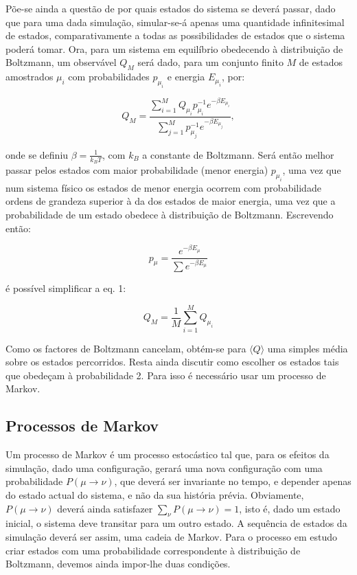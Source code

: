 \documentclass[a4paper,10pt]{article}
\begin{document}
\begin{multicols}{2}
Põe-se ainda a questão de por quais estados do sistema se deverá passar, dado que para uma dada simulação, simular-se-á apenas uma quantidade infinitesimal de estados, comparativamente a todas as possibilidades de estados que o sistema poderá tomar. Ora, para um sistema em equilíbrio obedecendo à distribuição de Boltzmann, um observável $Q_M$ será dado, para um conjunto finito $M$ de estados amostrados $\mu_i$ com probabilidades $p_{\mu_i}$ e energia $E_{\mu_i}$, por:

\begin{equation}
Q_M = \frac{\sum^M_{i=1}Q_{\mu_i}p_{\mu_i}^{-1}e^{-\beta E_{\mu_i}}}{\sum^M_{j=1}p_{\mu_j}^{-1}e^{-\beta E_{\mu_j}}} ,
\end{equation}

onde se definiu $\beta = \frac{1}{k_B T}$, com $k_B$ a constante de Boltzmann. Será então melhor passar pelos estados com maior probabilidade (menor energia) $p_{\mu_i}$, uma vez que num sistema físico os estados de menor energia ocorrem com probabilidade ordens de grandeza superior à da dos estados de maior energia, uma vez que a probabilidade de um estado obedece à distribuição de Boltzmann. Escrevendo então:

\begin{equation}
p_{\mu}=\frac{e^{-\beta E_{\mu}}}{\sum e^{-\beta E_{\mu}}}
\end{equation}

é possível simplificar a eq. 1:

\begin{equation}
Q_M = \frac{1}{M}\sum^M_{i=1}Q_{\mu_i}
\end{equation}

Como os factores de Boltzmann cancelam, obtém-se para $\langle Q \rangle$ uma simples média sobre os estados percorridos. Resta ainda discutir como escolher os estados tais que obedeçam à probabilidade 2. Para isso é necessário usar um processo de Markov.

\subsection{Processos de Markov}
Um processo de Markov é um processo estocástico tal que, para os efeitos da simulação, dado uma configuração, gerará uma nova configuração com uma probabilidade $P(\mu\rightarrow\nu)$, que deverá ser invariante no tempo, e depender apenas do estado actual do sistema, e não da sua história prévia. Obviamente, $P(\mu\rightarrow\nu)$ deverá ainda satisfazer $\sum_\nu P(\mu\rightarrow\nu) = 1$, isto é, dado um estado inicial, o sistema deve transitar para um outro estado. A sequência de estados da simulação deverá ser assim, uma cadeia de Markov. Para o processo em estudo criar estados com uma probabilidade correspondente à distribuição de Boltzmann, devemos ainda impor-lhe duas condições.


\end{multicols}
\end{document}
